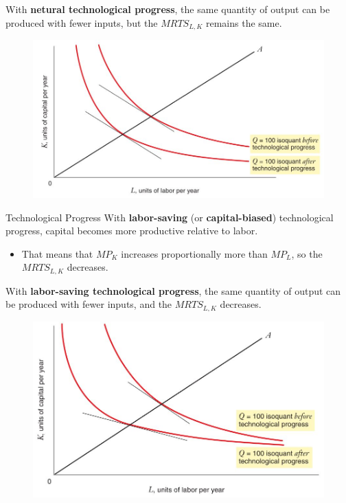 \documentclass[11pt,t]{beamer}
\begin{document}
\begin{frame}
  With \textbf{netural technological progress}, the same quantity of output can be produced with fewer inputs, but the $MRTS_{L,K}$ remains the same.

  \bigskip
  \begin{figure}
    \includegraphics[width=0.8\linewidth]{figures/fig6_20.jpg}
  \end{figure}
\end{frame}

\begin{frame}{Technological Progress}
  With \textbf{labor-saving} (or \textbf{capital-biased}) technological progress, capital becomes more productive relative to labor.

  \bigskip
  \begin{itemize}
    \item That means that $MP_K$ increases proportionally more than $MP_L$, so the $MRTS_{L,K}$ decreases.
  \end{itemize}
\end{frame}

\begin{frame}
  With \textbf{labor-saving technological progress}, the same quantity of output can be produced with fewer inputs, and the $MRTS_{L,K}$ decreases.

  \bigskip
  \begin{figure}
    \includegraphics[width=0.8\linewidth]{figures/fig6_21.jpg}
  \end{figure}
\end{frame}
\end{document}

